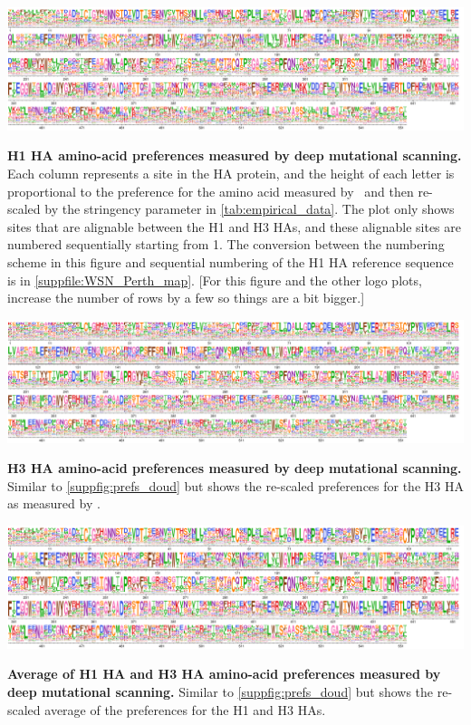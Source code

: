 \documentclass[11pt]{article}
\newcommand\jdbcomment[1]{{\color{red}[#1]}}
\begin{document}
\begin{suppfig}[H]
\centerline{\includegraphics[width=\textwidth]{figures/prefs_doud}}
\caption{\label{suppfig:prefs_doud}
\textbf{H1 HA amino-acid preferences measured by deep mutational scanning.}
Each column represents a site in the HA protein, and the height of each letter is proportional to the preference for the amino acid measured by~\citet{doud2016accurate} and then re-scaled by the stringency parameter in \ref{tab:empirical_data}. 
The plot only shows sites that are alignable between the H1 and H3 HAs, and these alignable sites are numbered sequentially starting from 1.
The conversion between the numbering scheme in this figure and sequential numbering of the H1 HA reference sequence is in \ref{suppfile:WSN_Perth_map}. 
\jdbcomment{For this figure and the other logo plots, increase the number of rows by a few so things are a bit bigger.}
}
\end{suppfig}

\begin{suppfig}[H]
\centerline{\includegraphics[width=\textwidth]{figures/prefs_lee}}
\caption{\label{suppfig:prefs_lee}
\textbf{H3 HA amino-acid preferences measured by deep mutational scanning.}
Similar to \ref{suppfig:prefs_doud} but shows the re-scaled preferences for the H3 HA as measured by \citet{lee2018deep}.
 }
\end{suppfig}

\begin{suppfig}[H]
\centerline{\includegraphics[width=\textwidth]{figures/prefs_average}}
\caption{\label{suppfig:prefs_average}
\textbf{Average of H1 HA  and H3 HA amino-acid preferences measured by deep mutational scanning.}
Similar to \ref{suppfig:prefs_doud} but shows the re-scaled average of the preferences for the H1 and H3 HAs.
}
\end{suppfig}
\end{document}
